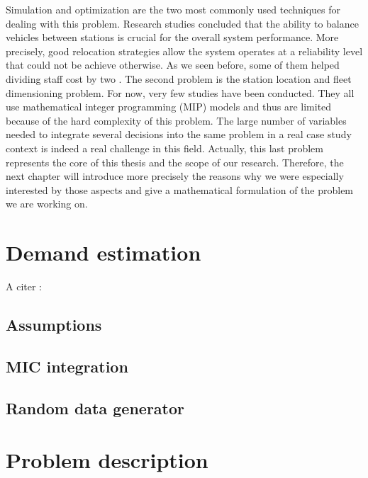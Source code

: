 \begin{bibunit}[ieeetr]
Simulation and optimization are the two most commonly used techniques for dealing with this problem.
Research studies concluded that the ability to balance vehicles between stations is crucial for the overall system performance.
More precisely, good relocation strategies allow the system operates at a reliability level that could not be achieve otherwise.
As we seen before, some of them helped dividing staff cost by two \cite{kek_decision_2009}.
The second problem is the station location and  fleet dimensioning problem.
For now, very few studies have been conducted.
They all use mathematical integer programming (MIP) models and thus are limited because of the hard complexity of this problem.
The large number of variables needed to integrate several decisions into the same problem in a real case study context is indeed a real challenge in this field.
Actually, this last problem represents the core of this thesis and the scope of our research.
Therefore, the next chapter will introduce more precisely the reasons why we were especially interested by those aspects and give a mathematical formulation of the problem we are working on.


\newpage
\section{Demand estimation}

A citer :\\
\cite{modele_deplacement_dreif_2008}


\subsection{Assumptions}
\subsection{MIC integration}
\subsection{Random data generator}


\newpage
\section{Problem description}


\newpage
{}
\renewcommand{\bibname}{Bibliography of chapter \thechapter}
\end{bibunit}
